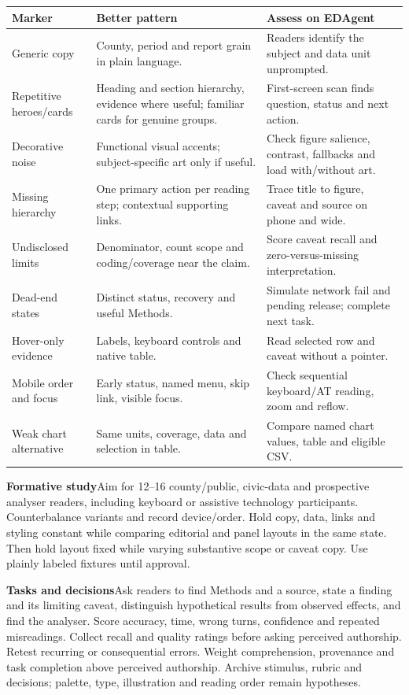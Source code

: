 \documentclass[11pt,a4paper]{article}
\newcommand{\lead}[2]{\textbf{#1}\enspace #2\par}
\begin{document}
{\small
\begin{tabularx}{\linewidth}{@{}p{32mm}Y Y@{}}
\toprule Marker & Better pattern & Assess on EDAgent\\\midrule
Generic copy & County, period and report grain in plain language. & Readers identify the subject and data unit unprompted.\\
Repetitive heroes/cards & Heading and section hierarchy, evidence where useful; familiar cards for genuine groups. & First-screen scan finds question, status and next action.\\
Decorative noise & Functional visual accents; subject-specific art only if useful. & Check figure salience, contrast, fallbacks and load with/without art.\\
Missing hierarchy & One primary action per reading step; contextual supporting links. & Trace title to figure, caveat and source on phone and wide.\\
Undisclosed limits & Denominator, count scope and coding/coverage near the claim. & Score caveat recall and zero-versus-missing interpretation.\\
Dead-end states & Distinct status, recovery and useful Methods. & Simulate network fail and pending release; complete next task.\\
Hover-only evidence & Labels, keyboard controls and native table. & Read selected row and caveat without a pointer.\\
Mobile order and focus & Early status, named menu, skip link, visible focus. & Check sequential keyboard/AT reading, zoom and reflow.\\
Weak chart alternative & Same units, coverage, data and selection in table. & Compare named chart values, table and eligible CSV.\\
\bottomrule
\end{tabularx}}
\lead{Formative study}{Aim for 12--16 county/public, civic-data and prospective analyser readers, including keyboard or assistive technology participants. Counterbalance variants and record device/order. Hold copy, data, links and styling constant while comparing editorial and panel layouts in the same state. Then hold layout fixed while varying substantive scope or caveat copy. Use plainly labeled fixtures until approval.}
\lead{Tasks and decisions}{Ask readers to find Methods and a source, state a finding and its limiting caveat, distinguish hypothetical results from observed effects, and find the analyser. Score accuracy, time, wrong turns, confidence and repeated misreadings. Collect recall and quality ratings before asking perceived authorship. Retest recurring or consequential errors. Weight comprehension, provenance and task completion above perceived authorship. Archive stimulus, rubric and decisions; palette, type, illustration and reading order remain hypotheses.}
\end{document}
